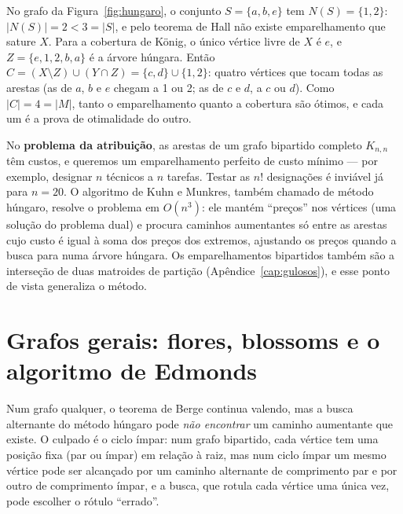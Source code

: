 \begin{exemplo}\label{ex:hall}
No grafo da Figura~\ref{fig:hungaro}, o conjunto $S=\{a,b,e\}$ tem $N(S)=\{1,2\}$: $|N(S)|=2<3=|S|$, e pelo teorema de Hall não existe emparelhamento que sature $X$. Para a cobertura de König, o único vértice livre de $X$ é $e$, e $Z=\{e,1,2,b,a\}$ é a árvore húngara. Então $C=(X\setminus Z)\cup(Y\cap Z)=\{c,d\}\cup\{1,2\}$: quatro vértices que tocam todas as arestas (as de $a$, $b$ e $e$ chegam a 1 ou 2; as de $c$ e $d$, a $c$ ou $d$). Como $|C|=4=|M|$, tanto o emparelhamento quanto a cobertura são ótimos, e cada um é a prova de otimalidade do outro.
\end{exemplo}

\begin{complemento}
No \textbf{problema da atribuição}, as arestas de um grafo bipartido completo $K_{n,n}$ têm custos, e queremos um emparelhamento perfeito de custo mínimo --- por exemplo, designar $n$ técnicos a $n$ tarefas. Testar as $n!$ designações é inviável já para $n=20$. O algoritmo de Kuhn e Munkres, também chamado de método húngaro, resolve o problema em $O(n^3)$: ele mantém ``preços'' nos vértices (uma solução do problema dual) e procura caminhos aumentantes só entre as arestas cujo custo é igual à soma dos preços dos extremos, ajustando os preços quando a busca para numa árvore húngara. Os emparelhamentos bipartidos também são a interseção de duas matroides de partição (Apêndice~\ref{cap:gulosos}), e esse ponto de vista generaliza o método.
\end{complemento}

\section{Grafos gerais: flores, blossoms e o algoritmo de Edmonds}\label{sec:blossom}
Num grafo qualquer, o teorema de Berge continua valendo, mas a busca alternante do método húngaro pode \emph{não encontrar} um caminho aumentante que existe. O culpado é o ciclo ímpar: num grafo bipartido, cada vértice tem uma posição fixa (par ou ímpar) em relação à raiz, mas num ciclo ímpar um mesmo vértice pode ser alcançado por um caminho alternante de comprimento par e por outro de comprimento ímpar, e a busca, que rotula cada vértice uma única vez, pode escolher o rótulo ``errado''.

